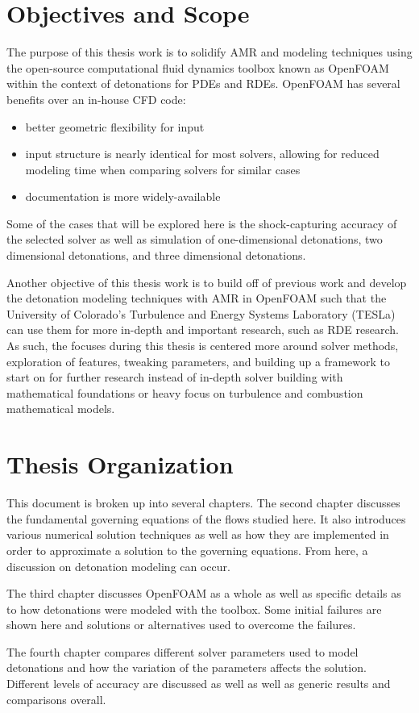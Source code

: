 \section{Objectives and Scope}
The purpose of this thesis work is to solidify AMR and modeling techniques using the open-source computational fluid dynamics toolbox known as OpenFOAM\cite{weller} within the context of detonations for PDEs and RDEs. OpenFOAM has several benefits over an in-house CFD code:

\begin{itemize}
    \item better geometric flexibility for input 
    \item input structure is nearly identical for most solvers, allowing for reduced modeling time when comparing solvers for similar cases
    \item documentation is more widely-available
\end{itemize}

\noindent Some of the cases that will be explored here is the shock-capturing accuracy of the selected solver as well as simulation of one-dimensional detonations, two dimensional detonations, and three dimensional detonations.

Another objective of this thesis work is to build off of previous work \cite{towery1} and develop the detonation modeling techniques with AMR in OpenFOAM such that the University of Colorado's Turbulence and Energy Systems Laboratory (TESLa) can use them for more in-depth and important research, such as RDE research. As such, the focuses during this thesis is centered more around solver methods, exploration of features, tweaking parameters, and building up a framework to start on for further research instead of in-depth solver building with mathematical foundations or heavy focus on turbulence and combustion mathematical models. 

\section{Thesis Organization}
This document is broken up into several chapters. The second chapter discusses the fundamental governing equations of the flows studied here. It also introduces various numerical solution techniques as well as how they are implemented in order to approximate a solution to the governing equations. From here, a discussion on detonation modeling can occur. 

The third chapter discusses OpenFOAM as a whole as well as specific details as to how detonations were modeled with the toolbox. Some initial failures are shown here and solutions or alternatives used to overcome the failures. 

The fourth chapter compares different solver parameters used to model detonations and how the variation of the parameters affects the solution. Different levels of accuracy are discussed as well as well as generic results and comparisons overall. 
